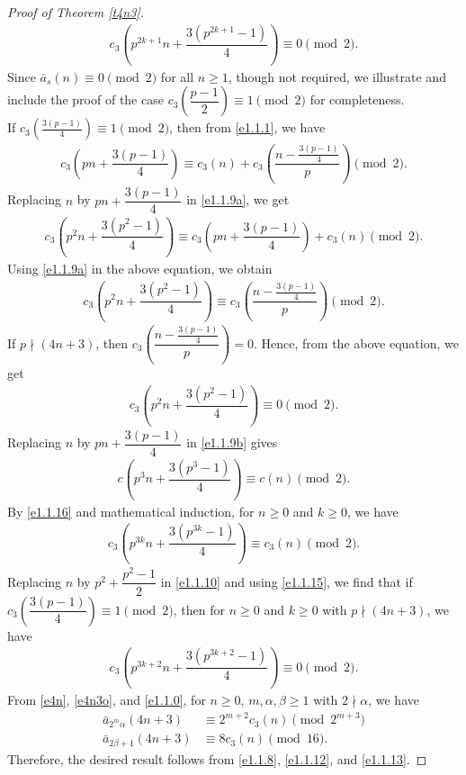 \documentclass[11pt,a4paper]{article}
\numberwithin{equation}{section}
\theoremstyle{plain}
\begin{document}
\begin{proof}[Proof of Theorem \ref{t4n3}\unskip]
\begin{align}
		c_3\left(p^{2k+1}n+\dfrac{3(p^{2k+1}-1)}{4}\right)\equiv 0\pmod 2.\label{e1.1.8}
	\end{align}
	Since $\bar{a}_s(n)\equiv 0\pmod2$ for all $n\ge 1$, though not required, we illustrate and include the proof of the case $c_3\left(\dfrac{p-1}{2}\right)\equiv 1\pmod 2$ for completeness.\\
	If $c_3\left(\frac{3(p-1)}{4}\right)\equiv 1\pmod 2$, then from \eqref{e1.1.1}, we have
	\begin{align}\label{e1.1.9a}
	c_3\left(pn+\dfrac{3(p-1)}{4}\right)\equiv c_3(n)+c_3\left(\dfrac{n-\frac{3(p-1)}{4}}{p}\right)\pmod 2.
	\end{align}
	Replacing $n$ by $pn+\dfrac{3(p-1)}{4}$ in \eqref{e1.1.9a}, we get
	\begin{align}
		c_3\left(p^2n+\dfrac{3(p^2-1)}{4}\right)\equiv c_3\left(pn+\dfrac{3(p-1)}{4}\right)+c_3(n)\pmod 2.\label{e1.1.9}
	\end{align}
	Using \eqref{e1.1.9a} in the above equation, we obtain
	\begin{align}\label{e1.1.9b}
	c_3\left(p^2n+\dfrac{3(p^2-1)}{4}\right)\equiv c_3\left(\dfrac{n-\frac{3(p-1)}{4}}{p}\right)\pmod 2.
	\end{align}
	If $p\nmid(4n+3)$, then $c_3\left(\dfrac{n-\frac{3(p-1)}{4}}{p}\right)=0$. Hence, from the above equation, we get
	\begin{align}\label{e1.1.15}
	c_3\left(p^2n+\dfrac{3(p^2-1)}{4}\right)\equiv 0\pmod 2.
	\end{align}
	Replacing $n$ by $pn+\dfrac{3(p-1)}{4}$ in \eqref{e1.1.9b} gives
	\begin{align}\label{e1.1.16}
	c\left(p^3n+\dfrac{3(p^3-1)}{4}\right)\equiv c(n)\pmod 2.
	\end{align}
	By \eqref{e1.1.16} and mathematical induction, for $n\ge 0$ and $k\ge 0$, we have
	\begin{align}
		c_3\left(p^{3k}n+\dfrac{3(p^{3k}-1)}{4}\right)\equiv c_3(n)\pmod 2.\label{e1.1.10}
	\end{align}
	Replacing $n$ by $p^2+\dfrac{p^2-1}{2}$ in \eqref{e1.1.10} and using \eqref{e1.1.15}, we find that if $c_3\left(\dfrac{3(p-1)}{4}\right)\equiv 1\pmod 2$, then for $n\ge 0$ and $k\ge0$ with $p\nmid(4n+3)$, we have
	\begin{align}\label{e1.1.17}
	c_3\left(p^{3k+2}n+\dfrac{3(p^{3k+2}-1)}{4}\right)\equiv 0\pmod 2.
	\end{align}
	From \eqref{e4n}, \eqref{e4n3o}, and \eqref{e1.1.0}, for $n\ge0$, $m,\alpha,\beta\ge1$ with $2\nmid \alpha$, we have
	\begin{align}
		\bar{a}_{2^m\alpha}(4n+3)&\equiv 2^{m+2}c_3(n)\pmod {2^{m+3}}\label{e1.1.12}\\
		\bar{a}_{2\beta+1}(4n+3)&\equiv 8c_3(n)\pmod{16}.\label{e1.1.13}
	\end{align}
	Therefore, the desired result follows from \eqref{e1.1.8}, \eqref{e1.1.12},  and \eqref{e1.1.13}.
\end{proof}
\end{document}
